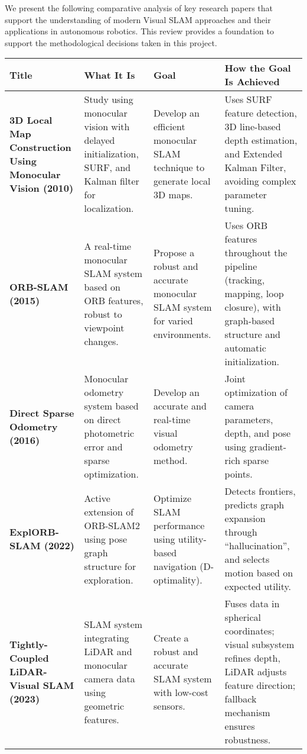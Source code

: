 \documentclass[a4paper,12pt]{article}
\newcommand{\cellwrap}[1]{\RaggedRight #1\hfill}
\begin{document}
We present the following comparative analysis of key research papers that support the understanding of modern Visual SLAM approaches and their applications in autonomous robotics. This review provides a foundation to support the methodological decisions taken in this project.

\begin{center}
\sloppy
\begin{tabular}{|p{3cm}|p{4cm}|p{3cm}|p{4cm}|}
\hline
\textbf{Title} & \textbf{What It Is} & \textbf{Goal} & \textbf{How the Goal Is Achieved} \\
\hline
\cellwrap{\textbf{3D Local Map Construction Using Monocular Vision (2010)}} & \cellwrap{Study using monocular vision with delayed initialization, SURF, and Kalman filter for localization.} & \cellwrap{Develop an efficient monocular SLAM technique to generate local 3D maps.} & \cellwrap{Uses SURF feature detection, 3D line-based depth estimation, and Extended Kalman Filter, avoiding complex parameter tuning.} \\
\hline
\cellwrap{\textbf{ORB-SLAM (2015)}} & \cellwrap{A real-time monocular SLAM system based on ORB features, robust to viewpoint changes.} & \cellwrap{Propose a robust and accurate monocular SLAM system for varied environments.} & \cellwrap{Uses ORB features throughout the pipeline (tracking, mapping, loop closure), with graph-based structure and automatic initialization.} \\
\hline
\cellwrap{\textbf{Direct Sparse Odometry (2016)}} & \cellwrap{Monocular odometry system based on direct photometric error and sparse optimization.} & \cellwrap{Develop an accurate and real-time visual odometry method.} & \cellwrap{Joint optimization of camera parameters, depth, and pose using gradient-rich sparse points.} \\
\hline
\cellwrap{\textbf{ExplORB-SLAM (2022)}} & \cellwrap{Active extension of ORB-SLAM2 using pose graph structure for exploration.} & \cellwrap{Optimize SLAM performance using utility-based navigation (D-optimality).} & \cellwrap{Detects frontiers, predicts graph expansion through “hallucination”, and selects motion based on expected utility.} \\
\hline
\cellwrap{\textbf{Tightly-Coupled LiDAR-Visual SLAM (2023)}} & \cellwrap{SLAM system integrating LiDAR and monocular camera data using geometric features.} & \cellwrap{Create a robust and accurate SLAM system with low-cost sensors.} & \cellwrap{Fuses data in spherical coordinates; visual subsystem refines depth, LiDAR adjusts feature direction; fallback mechanism ensures robustness.} \\
\hline
\end{tabular}
\end{center}
\end{document}
